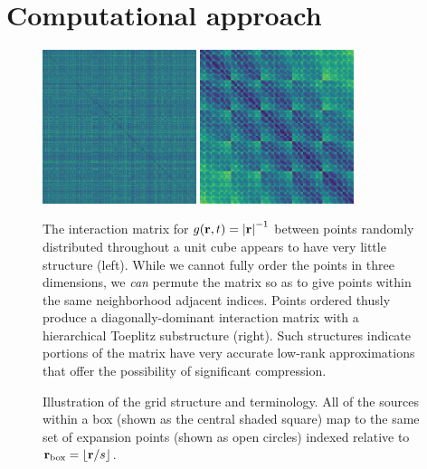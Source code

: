 \section{Computational approach}

\begin{figure}
  \centering
  \includegraphics[width=0.4\textwidth]{figures/dist_mat_unsorted}
  \hspace{1cm}
  \includegraphics[width=0.4\textwidth]{figures/dist_mat_sorted}
  \caption{\label{fig:matrix structure} The interaction matrix for $g(\vb{r}, t) = \abs{\vb{r}}^{-1}$ between points randomly distributed throughout a unit cube appears to have very little structure (left).
    While we cannot fully order the points in three dimensions, we \emph{can} permute the matrix so as to give points within the same neighborhood adjacent indices.
    Points ordered thusly produce a diagonally-dominant interaction matrix with a hierarchical Toeplitz substructure (right).
    Such structures indicate portions of the matrix have very accurate low-rank approximations that offer the possibility of significant compression.
  }
\end{figure}

\begin{figure}
  \centering
  
  \caption{\label{fig:aim terminology} Illustration of the grid structure and terminology.
    All of the sources within a box (shown as the central shaded square) map to the same set of expansion points (shown as open circles) indexed relative to $\vb{r}_\text{box} = \lfloor\vb{r}/s\rfloor$.
  }
\end{figure}

